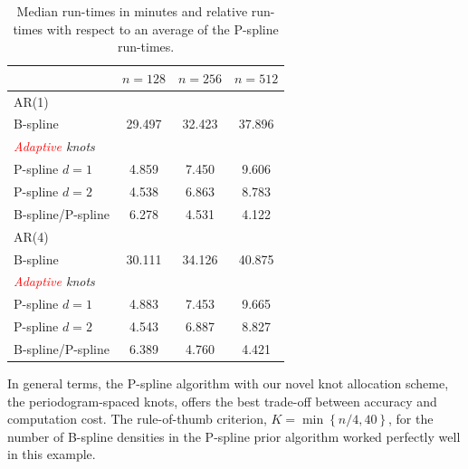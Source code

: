\documentclass[twocolumn,final]{svjour3}
\begin{document}
\begin{table}
	\centering
		\begin{tabular}{lccc}
			\toprule
			& $n=128$ & $n=256$ & $n=512$ \\ \hline
			AR(1)     &  &  &  \\ 
			B-spline &   29.497 & 32.423 & 37.896 \\
			\textit{\textcolor{red}{Adaptive} knots}& & &   \\
			\hspace{0.5em}P-spline $d=1$&  4.859 & 7.450 & 9.606\\
			\hspace{0.5em}P-spline $d=2$&  4.538 & 6.863 & 8.783\\
			B-spline/P-spline &  6.278 & 4.531 & 4.122 \\ \hline
			AR(4)     &  &  & \\ 
			B-spline & 30.111 & 34.126 & 40.875  \\
			\textit{\textcolor{red}{Adaptive} knots}& & &   \\
			\hspace{0.5em}P-spline $d=1$ & 4.883 & 7.453 & 9.665 \\
			\hspace{0.5em}P-spline $d=2$& 4.543 & 6.887 & 8.827 \\
			B-spline/P-spline & 6.389 & 4.760 & 4.421 \\	
			\bottomrule
		\end{tabular}
	\caption{Median run-times in minutes and relative run-times with respect to an average of the P-spline run-times.}
	\label{table:sim_time}
\end{table}


In general terms, the P-spline algorithm with our novel knot allocation scheme, the periodogram-spaced knots, offers the best trade-off between accuracy and computation cost.  The  rule-of-thumb criterion,  $K=\min\left\{n/4, 40\right\}$, for the number of B-spline densities in the P-spline prior algorithm worked perfectly well in this example. 

\end{document}
